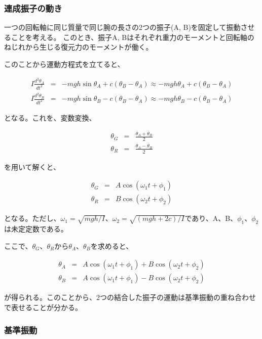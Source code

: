 \documentclass[uplatex,11pt]{jsarticle}
\begin{document}
\subsubsection*{連成振子の動き}

一つの回転軸に同じ質量で同じ腕の長さの2つの振子(A, B)を固定して振動させることを考える。
このとき、振子A, Bはそれぞれ重力のモーメントと回転軸のねじれから生じる復元力のモーメントが働く。

このことから運動方程式を立てると、

\begin{eqnarray*}
    I\frac{d^2\theta_A}{dt^2} & = & -mgh \sin \theta_A + c(\theta_B - \theta_A) \approx -mgh\theta_A  + c(\theta_B - \theta_A) \\
    I\frac{d^2\theta_B}{dt^2} & = & -mgh \sin \theta_B - c(\theta_B - \theta_A) \approx -mgh\theta_B  - c(\theta_B - \theta_A)
\end{eqnarray*}

となる。これを、変数変換、

\begin{eqnarray*}
    \theta_G & = & \frac{\theta_A + \theta_B}{2} \\
    \theta_R & = & \frac{\theta_A - \theta_B}{2}
\end{eqnarray*}

を用いて解くと、

\begin{eqnarray*}
    \theta_G & = & A\cos(\omega_1t + \phi_1) \\
    \theta_R & = & B\cos(\omega_2t + \phi_2)
\end{eqnarray*}

となる。ただし、$\omega_1 = \sqrt{mgh/I}$、$\omega_2 = \sqrt{(mgh+2c)/I}$であり、A、B、$\phi_1$、$\phi_2$は未定定数である。

ここで、$\theta_G$、$\theta_R$から$\theta_A$、$\theta_B$を求めると、

\begin{eqnarray*}
    \theta_A & = & A\cos(\omega_1t + \phi_1) + B\cos(\omega_2t + \phi_2) \\
    \theta_B & = & A\cos(\omega_1t + \phi_1) - B\cos(\omega_2t + \phi_2)
\end{eqnarray*}

が得られる。このことから、2つの結合した振子の運動は基準振動の重ね合わせで表せることが分かる。

\subsubsection*{基準振動}
\end{document}
